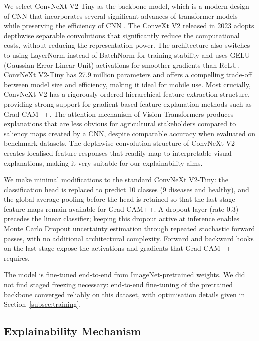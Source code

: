 \documentclass[pdflatex,sn-mathphys-num]{sn-jnl}%
\begin{document}
We select ConvNeXt V2-Tiny as the backbone model, which is a modern design of CNN that incorporates several significant advances of transformer models while preserving the efficiency of CNN \cite{woo2023convnext}. The ConveXt V2 released in 2023 adopts depthwise separable convolutions that significantly reduce the computational costs, without reducing the representation power. The architecture also switches to using LayerNorm instead of BatchNorm for training stability and uses GELU (Gaussian Error Linear Unit) activations for smoother gradients than ReLU. ConvNeXt V2-Tiny has 27.9 million parameters and offers a compelling trade-off between model size and efficiency, making it ideal for mobile use. Most crucially, ConvNeXt V2 has a rigorously ordered hierarchical feature extraction structure, providing strong support for gradient-based feature-explanation methods such as Grad-CAM++. The attention mechanism of Vision Transformers produces explanations that are less obvious for agricultural stakeholders compared to saliency maps created by a CNN, despite comparable accuracy when evaluated on benchmark datasets. The depthwise convolution structure of ConvNeXt V2 creates localised feature responses that readily map to interpretable visual explanations, making it very suitable for our explainability aims.

We make minimal modifications to the standard ConvNeXt V2-Tiny: the classification head is replaced to predict 10 classes (9 diseases and healthy), and the global average pooling before the head is retained so that the last-stage feature maps remain available for Grad-CAM++. A dropout layer (rate 0.3) precedes the linear classifier; keeping this dropout active at inference enables Monte Carlo Dropout uncertainty estimation through repeated stochastic forward passes, with no additional architectural complexity. Forward and backward hooks on the last stage expose the activations and gradients that Grad-CAM++ requires.

The model is fine-tuned end-to-end from ImageNet-pretrained weights. We did not find staged freezing necessary: end-to-end fine-tuning of the pretrained backbone converged reliably on this dataset, with optimisation details given in Section~\ref{subsec:training}.

\subsection{Explainability Mechanism}\label{subsec:explainability}
\end{document}
